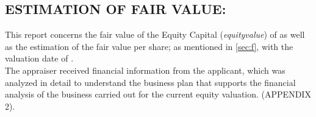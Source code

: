 
\subsection{ESTIMATION OF FAIR VALUE:}

This report concerns the fair value of the Equity Capital (\textit{\gls{equityvalue}}) of \textcolor{principal}{\empresaSolicitante} as well as the estimation of the fair value per share; as mentioned in \autoref{sec:f}, with the valuation date of \textcolor{principal}{\fechaValores}.\\[10pt]

The appraiser received financial information from the applicant, which was analyzed in detail to understand the business plan that supports the financial analysis of the business carried out for the current equity valuation. (\textcolor{secundario}{APPENDIX 2}).\\


